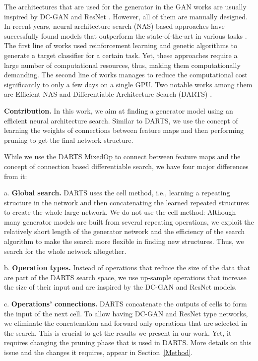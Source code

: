 \documentclass[10pt,twocolumn,letterpaper]{article}
\begin{document}
The architectures that are used for the generator in the GAN works are usually inspired by DC-GAN \cite{dcgan} and ResNet \cite{resnet}. However, all of them are manually designed. 
In recent years, neural architecture search (NAS) based approaches have successfully found models that outperform the state-of-the-art in various tasks \cite{huang2018gpipe}. The first line of works used reinforcement learning \cite{zophNasRL} and genetic algorithms \cite{Real18Regularized} to generate a target classifier for a certain task. Yet, these approaches require a large number of computational resources, thus, making them computationally demanding. The second line of works manages to reduce the computational cost significantly to only a few days on a single GPU. Two notable works among them are Efficient NAS \cite{ENAS} and Differentiable Architecture Search (DARTS) \cite{liu19darts}. 

{\bf Contribution.} 
In this work, we aim at finding a generator model using an efficient neural architecture search. 
Similar to DARTS, we use the concept of learning the weights of connections between feature maps and then performing pruning to get the final network structure. 

While we use the DARTS MixedOp to connect between feature maps and the concept of connection based differentiable search,  
we have four major differences from it:

a. {\bf Global search.} DARTS uses the cell method, i.e., learning a repeating structure in the network and then concatenating the learned repeated structures to create the whole large network. We do not use the cell method: Although many generator models are built from several repeating operations, we exploit the relatively short length of the generator network and the efficiency of the search algorithm to make the search more flexible in finding new structures. Thus, we search for the whole network altogether.

b. {\bf Operation types.} Instead of operations that reduce the size of the data that are part of the DARTS search space, we use up-sample operations that increase the size of their input and are inspired by the DC-GAN and ResNet models. 

c. {\bf Operations' connections.} DARTS concatenate the outputs of cells to form the input of the next cell. To allow having DC-GAN and ResNet type networks, we eliminate the concatenation and forward only operations that are selected in the search.  This is crucial to get the results we present in our work. Yet, it requires changing the pruning phase that is used in DARTS. More details on this issue and the changes it requires, appear in Section~\ref{Method}.
\end{document}
